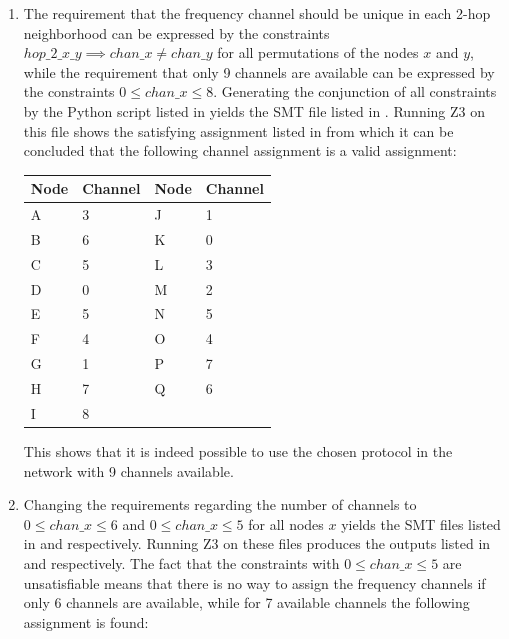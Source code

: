 \begin{enumerate}
  \item The requirement that the frequency channel should be unique in each 2-hop neighborhood can be expressed by the constraints $hop\_2\_x\_y \implies chan\_x \neq chan\_y$ for all permutations of the nodes $x$ and $y$, while the requirement that only 9 channels are available can be expressed by the constraints $0 \leq chan\_x \leq 8$. Generating the conjunction of all constraints by the Python script listed in  yields the SMT file listed in . Running Z3 on this file shows the satisfying assignment listed in  from which it can be concluded that the following channel assignment is a valid assignment:
  \begin{table}[]
    \begin{tabular}{ll|ll}
      Node & Channel & Node & Channel \\ \hline
      A    & 3       & J    & 1       \\
      B    & 6       & K    & 0       \\
      C    & 5       & L    & 3       \\
      D    & 0       & M    & 2       \\
      E    & 5       & N    & 5       \\
      F    & 4       & O    & 4       \\
      G    & 1       & P    & 7       \\
      H    & 7       & Q    & 6       \\
      I    & 8       &      &        
   \end{tabular}
  \end{table}
  This shows that it is indeed possible to use the chosen protocol in the network with 9 channels available.
  \item Changing the requirements regarding the number of channels to $0 \leq chan\_x \leq 6$ and $0 \leq chan\_x \leq 5$ for all nodes $x$ yields the SMT files listed in  and  respectively. Running Z3 on these files produces the outputs listed in  and  respectively. The fact that the constraints with $0 \leq chan\_x \leq 5$ are unsatisfiable means that there is no way to assign the frequency channels if only 6 channels are available, while for 7 available channels the following assignment is found:
  \begin{table}[]
    \begin{tabular}{ll|ll}

\end{tabular}
\end{table}
\end{enumerate}
